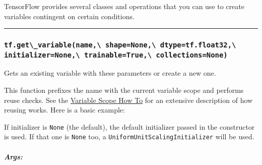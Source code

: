 TensorFlow provides several classes and operations that you can use to
create variables contingent on certain conditions.

\begin{center}\rule{0.5\linewidth}{\linethickness}\end{center}

\subsubsection{\texorpdfstring{\lstinline{tf.get\_variable(name,\ shape=None,\ dtype=tf.float32,\ initializer=None,\ trainable=True,\ collections=None)}
}{tf.get\_variable(name, shape=None, dtype=tf.float32, initializer=None, trainable=True, collections=None) }}\label{tf.getux5fvariablename-shapenone-dtypetf.float32-initializernone-trainabletrue-collectionsnone}

Gets an existing variable with these parameters or create a new one.

This function prefixes the name with the current variable scope and
performs reuse checks. See the
\href{../../how_tos/variable_scope/index.md}{Variable Scope How To} for
an extensive description of how reusing works. Here is a basic example:

\begin{Shaded}
\begin{Highlighting}[]
 \NormalTok{):}
    \OperatorTok{=} \NormalTok{, [}\NormalTok{])  }
    \OperatorTok{=} \NormalTok{, [}\NormalTok{])  }
 \OperatorTok{=}\NormalTok{)}
    \OperatorTok{=} \NormalTok{)  }
\end{Highlighting}
\end{Shaded}

If initializer is \lstinline{None} (the default), the default initializer
passed in the constructor is used. If that one is \lstinline{None} too, a
\lstinline{UniformUnitScalingInitializer} will be used.

\subparagraph{Args: }\label{args-16}

